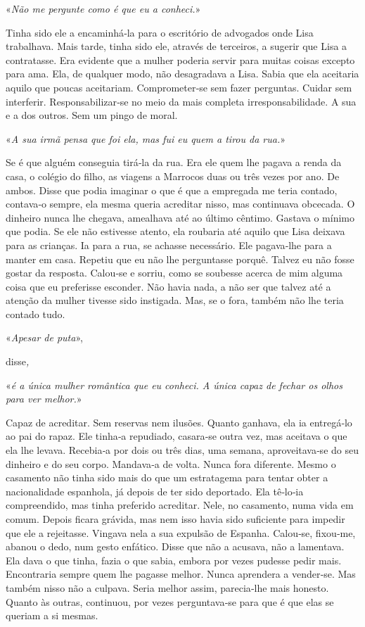 «\emph{Não me pergunte como é que eu a conheci.}»

Tinha sido ele a encaminhá­‑la para o escritório de advogados onde Lisa
trabalhava. Mais tarde, tinha sido ele, através de terceiros, a sugerir
que Lisa a contratasse. Era evidente que a mulher poderia servir para
muitas coisas excepto para ama. Ela, de qualquer modo, não desagradava a
Lisa. Sabia que ela aceitaria aquilo que poucas aceitariam.
Comprometer­‑se sem fazer perguntas. Cuidar sem interferir.
Responsabilizar­‑se no meio da mais completa irresponsabilidade. A sua e
a dos outros. Sem um pingo de moral.

«\emph{A sua irmã pensa que foi ela, mas fui eu quem a tirou da rua.}»

Se é que alguém conseguia tirá­‑la da rua. Era ele quem lhe pagava a
renda da casa, o colégio do filho, as viagens a Marrocos duas ou três
vezes por ano. De ambos. Disse que podia imaginar o que é que a
empregada me teria contado, contava­‑o sempre, ela mesma queria
acreditar nisso, mas continuava obcecada. O dinheiro nunca lhe chegava,
amealhava até ao último cêntimo. Gastava o mínimo que podia. Se ele não
estivesse atento, ela roubaria até aquilo que Lisa deixava para as
crianças. Ia para a rua, se achasse necessário. Ele pagava­‑lhe para a
manter em casa. Repetiu que eu não lhe perguntasse porquê. Talvez eu não
fosse gostar da resposta. Calou­‑se e sorriu, como se soubesse acerca de
mim alguma coisa que eu preferisse esconder. Não havia nada, a não ser
que talvez até a atenção da mulher tivesse sido instigada. Mas, se o
fora, também não lhe teria contado tudo.

«\emph{Apesar de puta}»,

disse\emph{,}

«\emph{é a única mulher romântica que eu conheci. A única capaz de
fechar os olhos para ver melhor.}»

Capaz de acreditar. Sem reservas nem ilusões. Quanto ganhava, ela ia
entregá­‑lo ao pai do rapaz. Ele tinha­‑a repudiado, casara­‑se outra
vez, mas aceitava o que ela lhe levava. Recebia­‑a por dois ou três
dias, uma semana, aproveitava­‑se do seu dinheiro e do seu corpo.
Mandava­‑a de volta. Nunca fora diferente. Mesmo o casamento não tinha
sido mais do que um estratagema para tentar obter a nacionalidade
espanhola, já depois de ter sido deportado. Ela tê­‑lo­‑ia compreendido,
mas tinha preferido acreditar. Nele, no casamento, numa vida em comum.
Depois ficara grávida, mas nem isso havia sido suficiente para impedir
que ele a rejeitasse. Vingava nela a sua expulsão de Espanha. Calou­‑se,
fixou­‑me, abanou o dedo, num gesto enfático. Disse que não a acusava,
não a lamentava. Ela dava o que tinha, fazia o que sabia, embora por
vezes pudesse pedir mais. Encontraria sempre quem lhe pagasse melhor.
Nunca aprendera a vender­‑se. Mas também nisso não a culpava. Seria
melhor assim, parecia­‑lhe mais honesto. Quanto às outras, continuou,
por vezes perguntava­‑se para que é que elas se queriam a si mesmas.

